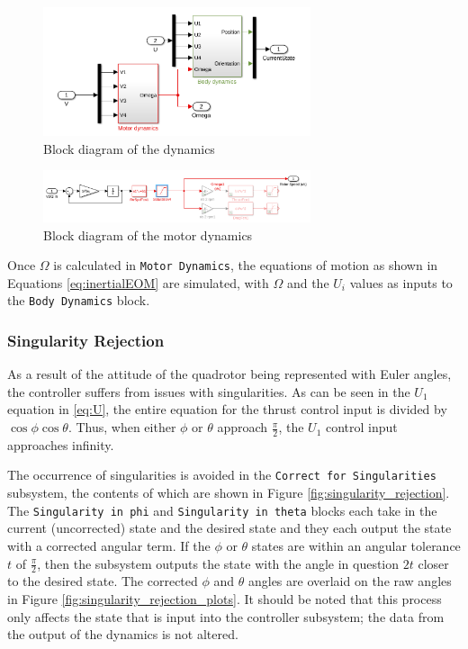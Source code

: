 \documentclass[12pt]{article}
\begin{document}
\begin{center}
\begin{figure}[H]
\captionsetup{width=1\textwidth}
\centering
\includegraphics[width=0.70\textwidth]{dynamics.png}
\caption{\label{fig:dynamics}Block diagram of the dynamics}
\end{figure}
\end{center}


\begin{center}
\begin{figure}[H]
\captionsetup{width=1\textwidth}
\centering
\includegraphics[width=0.70\textwidth]{motor_dynamics.png}
\caption{\label{fig:motor_dynamics}Block diagram of the motor dynamics}
\end{figure}
\end{center}

Once $\Omega$ is calculated in \texttt{Motor Dynamics}, the equations of motion as shown in Equations \ref{eq:inertialEOM} are simulated, with $\Omega$ and the $U_i$ values as inputs to the \texttt{Body Dynamics} block.

\subsubsection{Singularity Rejection} \label{sec:singularity_rejection}
As a result of the attitude of the quadrotor being represented with Euler angles, the controller suffers from issues with singularities. As can be seen in the $U_1$ equation in \ref{eq:U}, the entire equation for the thrust control input is divided by $\cos\phi\cos\theta$. Thus, when either $\phi$ or $\theta$ approach $\frac{\pi}{2}$, the $U_1$ control input approaches infinity. 

The occurrence of  singularities is avoided in the \texttt{Correct for Singularities} subsystem, the contents of which are shown in Figure \ref{fig:singularity_rejection}. The \texttt{Singularity in phi} and \texttt{Singularity in theta} blocks each take in the current (uncorrected) state and the desired state and they each output the state with a corrected angular term. If the $\phi$ or $\theta$ states are within an angular tolerance $t$ of $\frac{\pi}{2}$, then the subsystem outputs the state with the angle in question $2t$ closer to the desired state. The corrected $\phi$ and $\theta$ angles are overlaid on the raw angles in Figure \ref{fig:singularity_rejection_plots}. It should be noted that this process only affects the state that is input into the controller subsystem; the data from the output of the dynamics is not altered.
\end{document}
